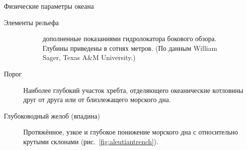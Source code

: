 \begin{chapter}{Физические параметры океана}
\begin{section}{Элементы рельефа}
\begin{description}
\begin{figure}[t!]
{дополненные показаниями гидролокатора бокового обзора. Глубины приведены в
сотнях метров. (По данным William Sager, Texas A\&M University.)}
\label{fig:wildeguyot}
\vspace{-3ex}
\end{figure}
%

\item[Порог]
Наиболее глубокий участок хребта, отделяющего океанические котловины друг от 
друга или от близлежащего морского дна.%
%

\item[Глубоководный желоб (впадина)]
Протяжённое, узкое и глубокое понижение морского дна с относительно
крутыми склонами (рис.~\ref{fig:aleutiantrench}).
%


\end{description}
\end{section}
\end{chapter}
